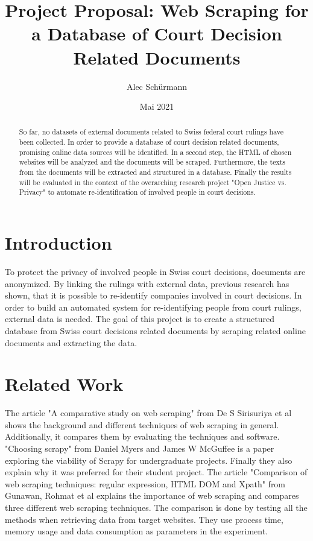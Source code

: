 \documentclass[11pt]{article}
\title{Project Proposal: Web Scraping for a Database of Court Decision Related Documents}
\author{Alec Schürmann}
\date{Mai 2021}
\begin{document}
	
\maketitle

\begin{abstract}

So far, no datasets of external documents related to Swiss federal court rulings have been collected. In order to provide a database of court decision related documents, promising online data sources will be identified. In a second step, the HTML of chosen websites will be analyzed and the documents will be scraped. Furthermore, the texts from the documents will be extracted and structured in a database. Finally the results will be evaluated in the context of the overarching research project "Open Justice vs. Privacy" to automate re-identification of involved people in court decisions.
	
\end{abstract}

\section{Introduction}
To protect the privacy of involved people in Swiss court decisions, documents are anonymized. By linking the rulings with external data, previous research \cite{vokinger2019re} has shown, that it is possible to re-identify companies involved in court decisions. In order to build an automated system for re-identifying people from court rulings, external data is needed. The goal of this project is to create a structured database from Swiss court decisions related documents by scraping related online documents and extracting the data.

\section{Related Work}
The article "A comparative study on web scraping" from De S Sirisuriya et al \cite{sirisuriya2015comparative} shows the background and different techniques of web scraping in general. Additionally, it compares them by evaluating the techniques and software. "Choosing scrapy" from Daniel Myers and James W McGuffee \cite{myers2015choosing} is a paper exploring the viability of Scrapy for undergraduate projects. Finally they also explain why it was preferred for their student project. The article "Comparison of web scraping techniques: regular expression, HTML DOM and Xpath" from Gunawan, Rohmat et al \cite{gunawan2019comparison} explains the importance of web scraping and compares three different web scraping techniques. The comparison is done by testing all the methods when retrieving data from target websites. They use process time, memory usage and data consumption as parameters in the experiment.
\end{document}
